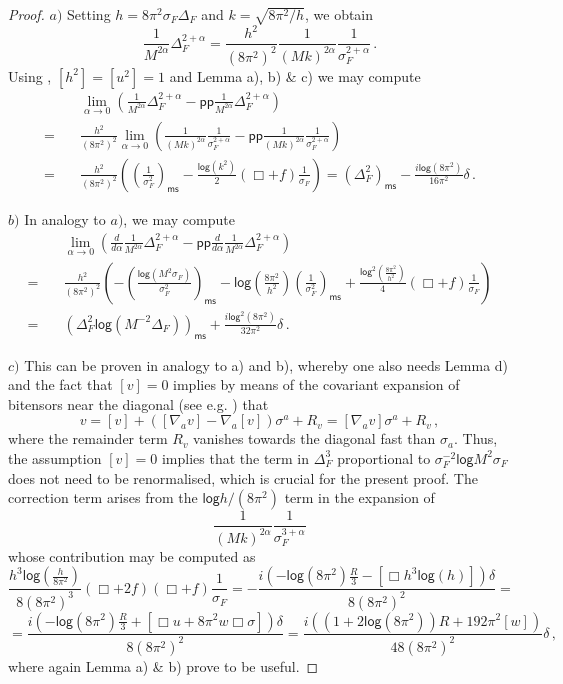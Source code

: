\documentclass[11pt]{book}
\newcommand{\com}[1]{{\color{red}\bf #1}}
\newcommand{\pp}{\mathsf{pp}}
\newcommand{\ms}{\mathsf{ms}}
\renewcommand{\log}{\mathsf{log}}
\theoremstyle{break}
\begin{document}
\com{
\begin{proof}
$a)$ Setting $h=8\pi^2\sigma_F \Delta_F$ and $k=\sqrt{8\pi^2/h}$, we obtain
%
$$\frac{1}{M^{2\alpha}}\Delta_F^{2+\alpha}=\frac{h^2}{(8\pi^2)^2}\frac{1}{(Mk)^{2\alpha}}\frac{1}{\sigma_F^{2+\alpha}}\,.$$ 
%
Using %
, $[h^2]=[u^2]=1$ and Lemma %
a), b) \& c) we may compute
%
\begin{align*}&\lim_{\alpha\to 0}\left(\frac{1}{M^{2\alpha}}\Delta_F^{2+\alpha}-\pp\frac{1}{M^{2\alpha}}\Delta_F^{2+\alpha}\right)\\
%
=\quad&\frac{h^2}{(8\pi^2)^2}\lim_{\alpha\to 0}\left(\frac{1}{(Mk)^{2\alpha}}\frac{1}{\sigma_F^{2+\alpha}}-\pp\frac{1}{(Mk)^{2\alpha}}\frac{1}{\sigma_F^{2+\alpha}}\right)\\
%
=\quad&\frac{h^2}{(8\pi^2)^2} \left(\left(\frac{1}{\sigma^2_F}\right)_\ms-\frac{\log (k^2)}{2}\left(\Box + f\right)\frac{1}{\sigma_F}\right)=(\Delta^2_F)_\ms-\frac{i\log(8\pi^2)}{16\pi^2}\delta\,.\end{align*}

$b)$ In analogy to $a)$, we may compute
%
\begin{align*}&\lim_{\alpha\to 0}\left(\frac{d}{d\alpha}\frac{1}{M^{2\alpha}}\Delta_F^{2+\alpha}-\pp\frac{d}{d\alpha}\frac{1}{M^{2\alpha}}\Delta_F^{2+\alpha}\right)\\
%
=\quad&\frac{h^2}{(8\pi^2)^2} \left(-\left(\frac{\log \left(M^2 \sigma_F\right)}{\sigma^2_F}\right)_\ms-\log\left(\frac{8\pi^2}{h^2}\right)\left(\frac{1}{\sigma^2_F}\right)_\ms+\frac{\log^2 \left(\frac{8\pi^2}{h^2}\right)}{4}\left(\Box + f\right)\frac{1}{\sigma_F}\right)\\
%
=\quad &\left(\Delta^2_F\log \left(M^{-2}\Delta_F\right)\right)_\ms+\frac{i\log^2(8\pi^2)}{32\pi^2}\delta\,.\end{align*}
 
$c)$ This can be proven in analogy to a) and b), whereby one also needs Lemma %
d) and the fact that $[v]=0$ implies by means of the covariant expansion of bitensors near the diagonal (see e.g. %
) that 
$$v=[v]+([\nabla_a v]-\nabla_a[v])\sigma^a+R_v=[\nabla_a v]\sigma^a+R_v\,,$$
where the remainder term $R_v$ vanishes towards the diagonal fast than $\sigma_a$. Thus, the assumption $[v]=0$ implies that the term in $\Delta^3_F$ proportional to $\sigma^{-2}_F \log M^2\sigma_F$ does not need to be renormalised, which is crucial for the present proof. The correction term arises from the  $\log h/(8\pi^2)$ term in the expansion of $$\frac{1}{(Mk)^{2\alpha}}\frac{1}{\sigma_F^{3+\alpha}}$$ whose contribution may be computed as
%
$$\frac{h^3 \log\left( \frac{h}{8\pi^2}\right)}{8(8\pi^2)^3}(\Box+2f)(\Box+f)\frac{1}{\sigma_F}=-\frac{i\left(-\log(8\pi^2)\frac{R}{3}-[\Box h^3 \log (h)]\right)\delta}{8(8\pi^2)^2}=$$
%
$$=\frac{i\left(-\log(8\pi^2)\frac{R}{3}+[\Box u + 8\pi^2 w\Box \sigma]\right)\delta}{8(8\pi^2)^2}=\frac{i\left((1+2\log(8\pi^2))R+192\pi^2[w]\right)}{48(8\pi^2)^2}\delta\,,$$
%
where again Lemma %
a) \& b) prove to be  useful.
\end{proof}
}
\end{document}
